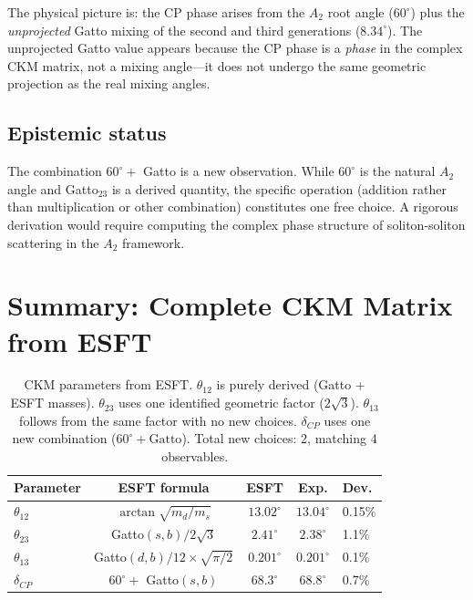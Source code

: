 ﻿\documentclass[prd,twocolumn,showpacs,superscriptaddress,groupedaddress]{revtex4-2}
\begin{document}
The physical picture is: the CP phase arises from the $A_2$ root angle ($60^\circ$) plus the \emph{unprojected} Gatto mixing of the second and third generations ($8.34^\circ$). The unprojected Gatto value appears because the CP phase is a \emph{phase} in the complex CKM matrix, not a mixing angle---it does not undergo the same geometric projection as the real mixing angles.

\subsection{Epistemic status}

The combination $60^\circ +$ Gatto is a new observation. While $60^\circ$ is the natural $A_2$ angle and Gatto$_{23}$ is a derived quantity, the specific operation (addition rather than multiplication or other combination) constitutes one free choice. A rigorous derivation would require computing the complex phase structure of soliton-soliton scattering in the $A_2$ framework.

\section{Summary: Complete CKM Matrix from ESFT}

\begin{table}[h]
\caption{CKM parameters from ESFT. $\theta_{12}$ is purely derived (Gatto + ESFT masses). $\theta_{23}$ uses one identified geometric factor ($2\sqrt{3}$). $\theta_{13}$ follows from the same factor with no new choices. $\delta_{CP}$ uses one new combination ($60^\circ + \text{Gatto}$). Total new choices: 2, matching 4 observables.}
\label{tab:ckm}
\begin{ruledtabular}
\begin{tabular}{lcccl}
Parameter & ESFT formula & ESFT & Exp. & Dev. \\
\hline
$\theta_{12}$ & $\arctan\!\sqrt{m_d/m_s}$ & $13.02^\circ$ & $13.04^\circ$ & 0.15\% \\
$\theta_{23}$ & Gatto$(s,b)/2\sqrt{3}$ & $2.41^\circ$ & $2.38^\circ$ & 1.1\% \\
$\theta_{13}$ & Gatto$(d,b)/12 \times \sqrt{\pi/2}$ & $0.201^\circ$ & $0.201^\circ$ & 0.1\% \\
$\delta_{CP}$ & $60^\circ +$ Gatto$(s,b)$ & $68.3^\circ$ & $68.8^\circ$ & 0.7\% \\
\end{tabular}
\end{ruledtabular}
\end{table}
\end{document}
